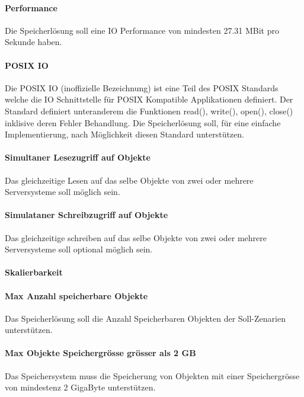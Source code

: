 \paragraph{Performance}\label{Soll-3-2}
Die Speicherlösung soll eine IO Performance von mindesten 27.31 MBit pro Sekunde haben.

\paragraph{POSIX IO}\label{Soll-3-3}
Die POSIX IO (inoffizielle Bezeichnung) ist eine Teil des POSIX Standards welche die IO Schnittstelle für POSIX Kompatible Applikationen definiert. Der Standard definiert unteranderem die Funktionen read(), write(), open(), close() inklisive deren Fehler Behandlung. Die Speicherlösung soll, für eine einfache Implementierung, nach Möglichkeit diesen Standard unterstützen. 

\paragraph{Simultaner Lesezugriff auf Objekte}\label{Soll-3-4}
Das gleichzeitige Lesen auf das selbe Objekte von zwei oder mehrere Serversysteme soll möglich sein.

\paragraph{Simulataner Schreibzugriff auf Objekte}\label{Soll-3-5}
Das gleichzeitige schreiben auf das selbe Objekte von zwei oder mehrere Serversysteme soll optional möglich sein.

\setcounter{paragraph}{0}
\renewcommand\theparagraph{Soll-4-\arabic{paragraph}}

\paragraph{Skalierbarkeit}\label{Soll-4-1}

\paragraph{Max Anzahl speicherbare Objekte}\label{Soll-4-2}
Das Speicherlösung soll die Anzahl Speicherbaren Objekten der Soll-Zenarien unterstützen. 

\paragraph{Max Objekte Speichergrösse grösser als 2 GB}\label{Soll-4-3}
Das Speichersystem muss die Speicherung von Objekten mit einer Speichergrösse von mindestenz 2 GigaByte unterstützen.

